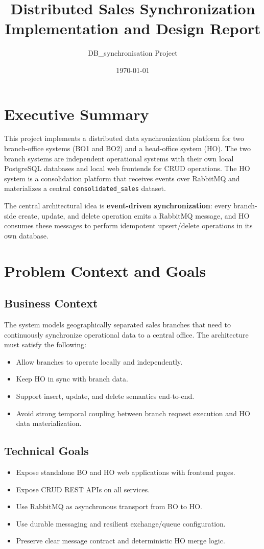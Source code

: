 \documentclass[11pt,a4paper]{article}
\title{Distributed Sales Synchronization\\Implementation and Design Report}
\author{DB\_synchronisation Project}
\date{\today}
\begin{document}
\maketitle
\tableofcontents
\newpage

\section{Executive Summary}
This project implements a distributed data synchronization platform for two branch-office systems (BO1 and BO2) and a head-office system (HO). The two branch systems are independent operational systems with their own local PostgreSQL databases and local web frontends for CRUD operations. The HO system is a consolidation platform that receives events over RabbitMQ and materializes a central \texttt{consolidated\_sales} dataset.

The central architectural idea is \textbf{event-driven synchronization}: every branch-side create, update, and delete operation emits a RabbitMQ message, and HO consumes these messages to perform idempotent upsert/delete operations in its own database.

\section{Problem Context and Goals}
\subsection{Business Context}
The system models geographically separated sales branches that need to continuously synchronize operational data to a central office. The architecture must satisfy the following:
\begin{itemize}[leftmargin=*]
  \item Allow branches to operate locally and independently.
  \item Keep HO in sync with branch data.
  \item Support insert, update, and delete semantics end-to-end.
  \item Avoid strong temporal coupling between branch request execution and HO data materialization.
\end{itemize}

\subsection{Technical Goals}
\begin{itemize}[leftmargin=*]
  \item Expose standalone BO and HO web applications with frontend pages.
  \item Expose CRUD REST APIs on all services.
  \item Use RabbitMQ as asynchronous transport from BO to HO.
  \item Use durable messaging and resilient exchange/queue configuration.
  \item Preserve clear message contract and deterministic HO merge logic.
\end{itemize}
\end{document}
